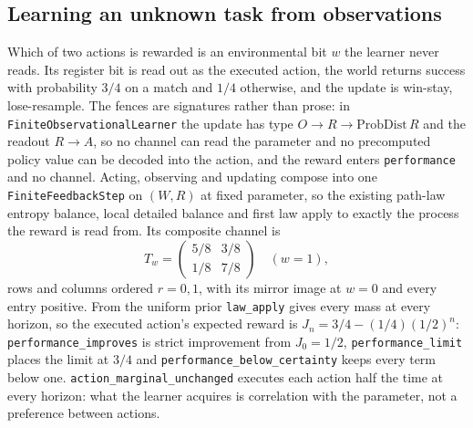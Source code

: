 \documentclass{article}
\begin{document}
\subsection{Learning an unknown task from observations}
\label{sec:supp-observational-learning}

Which of two actions is rewarded is an environmental bit $w$ the learner never
reads. Its register bit is read out as the executed action, the world returns
success with probability $3/4$ on a match and $1/4$ otherwise, and the update
is win-stay, lose-resample. The fences are signatures rather than prose: in
\texttt{FiniteObservationalLearner} the update has type
$O\to R\to\mathrm{ProbDist}\,R$ and the readout $R\to A$, so no channel can
read the parameter and no precomputed policy value can be decoded into the
action, and the reward enters \texttt{performance} and no channel. Acting,
observing and updating compose into one \texttt{FiniteFeedbackStep} on $(W,R)$
at fixed parameter, so the existing path-law entropy balance, local detailed
balance and first law apply to exactly the process the reward is read from.
Its composite channel is
\begin{equation}
 T_w=\begin{pmatrix}5/8&3/8\\1/8&7/8\end{pmatrix}\quad(w=1),
 \label{eq:observational-channel}
\end{equation}
rows and columns ordered $r=0,1$, with its mirror image at $w=0$ and every
entry positive. From the uniform prior \nolinkurl{law_apply} gives
every mass at every horizon, so the executed action's expected reward is
$J_n=3/4-(1/4)(1/2)^n$: \nolinkurl{performance_improves} is strict
improvement from $J_0=1/2$, \nolinkurl{performance_limit} places the
limit at $3/4$ and \nolinkurl{performance_below_certainty}
keeps every term below one. \nolinkurl{action_marginal_unchanged} executes each action half the time at every horizon: what the
learner acquires is correlation with the parameter, not a preference between
actions.
\end{document}
